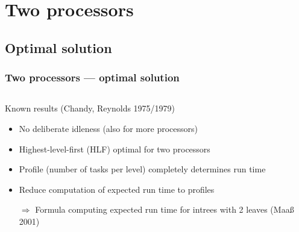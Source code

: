 \documentclass{beamer}
\newcommand{\profile}[1]{\left\llbracket #1 \right\rrbracket}
\begin{document}


\section{Two processors}

\subsection{Optimal solution}

\begin{frame}
  \frametitle{Two processors --- optimal solution}
  \begin{columns}
    \begin{column}{0.6\textwidth}
      \begin{block}{Known results (Chandy, Reynolds 1975/1979)}
        \begin{itemize}
        \item No deliberate idleness (also for more processors)
        \item Highest-level-first (HLF) optimal for two processors
        \item Profile (number of tasks per level) completely determines run time
        \item Reduce computation of expected run time to profiles
        
          $\Rightarrow$ Formula computing expected run time for intrees with 2 leaves (Maaß 2001)
        \end{itemize}
      \end{block}
    \end{column}
    \begin{column}{.4\textwidth}
      
    \end{column}
  \end{columns}
\end{frame}
\end{document}
